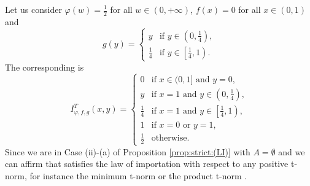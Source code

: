\begin{example} Let us consider $\varphi(w)=\frac{1}{2}$ for all $w \in (0,+\infty)$, $f(x)=0$ for all $x \in (0,1)$ and
	$$
	g(y)=\left\{ \begin{array}{ll}
		y &   \text{if }   y \in \left(0,\frac{1}{4}\right), \\[3pt]
		\frac{1}{4} &  \text{if }   y \in \left[\frac{1}{4},1\right).
	\end{array}
	\right.$$
	The corresponding \STP is
	\begin{equation*}
		I^T_{\varphi,f,g}(x,y) =\left\{ \begin{array}{ll}
			0 &  \text{if }  x \in (0,1] \text{ and } y=0, \\[3pt]
			y &   \text{if }   x=1 \text{ and } y \in \left(0,\frac{1}{4}\right), \\[3pt]
			\frac{1}{4} &  \text{if }  x=1 \text{ and } y \in \left[\frac{1}{4},1\right), \\[3pt]
			1 &  \text{if }  x=0 \text{ or } y=1, \\[3pt]
			\frac{1}{2} &  \text{otherwise}.
		\end{array}
		\right.
	\end{equation*}
	Since we are in Case (ii)-(a) of Proposition \ref{prop:strict:(LI)} with $A=\emptyset$ and we can affirm that \IT satisfies the law of importation with respect to any positive t-norm, for instance the minimum t-norm \TM or the product t-norm \TP.
\end{example}

